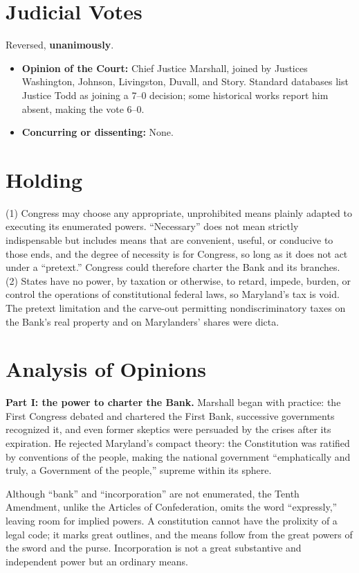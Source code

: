 \documentclass[12pt]{article}
\begin{document}
\section{Judicial Votes}

Reversed, \textbf{unanimously}.
\begin{itemize}
\item \textbf{Opinion of the Court:} Chief Justice Marshall, joined by Justices Washington, Johnson, Livingston, Duvall, and Story. Standard databases list Justice Todd as joining a 7--0 decision; some historical works report him absent, making the vote 6--0.
\item \textbf{Concurring or dissenting:} None.
\end{itemize}

\section{Holding}

(1) Congress may choose any appropriate, unprohibited means plainly adapted to executing its enumerated powers. ``Necessary'' does not mean strictly indispensable but includes means that are convenient, useful, or conducive to those ends, and the degree of necessity is for Congress, so long as it does not act under a ``pretext.'' Congress could therefore charter the Bank and its branches. (2) States have no power, by taxation or otherwise, to retard, impede, burden, or control the operations of constitutional federal laws, so Maryland's tax is void. The pretext limitation and the carve-out permitting nondiscriminatory taxes on the Bank's real property and on Marylanders' shares were dicta.

\section{Analysis of Opinions}

\textbf{Part I: the power to charter the Bank.} Marshall began with practice: the First Congress debated and chartered the First Bank, successive governments recognized it, and even former skeptics were persuaded by the crises after its expiration. He rejected Maryland's compact theory: the Constitution was ratified by conventions of the people, making the national government ``emphatically and truly, a Government of the people,'' supreme within its sphere.

Although ``bank'' and ``incorporation'' are not enumerated, the Tenth Amendment, unlike the Articles of Confederation, omits the word ``expressly,'' leaving room for implied powers. A constitution cannot have the prolixity of a legal code; it marks great outlines, and the means follow from the great powers of the sword and the purse. Incorporation is not a great substantive and independent power but an ordinary means.
\end{document}
